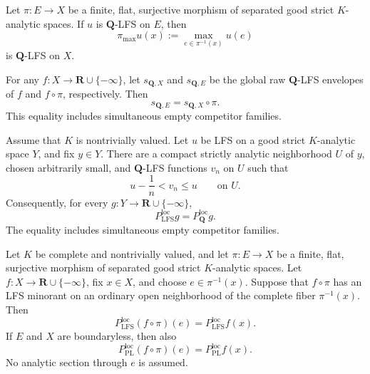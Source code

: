 \begin{theorem}
\label{thm:p031-rational-lfs-fiber-maximum}
Let $\pi:E\to X$ be a finite, flat, surjective morphism of separated good
strict $K$-analytic spaces.  If $u$ is $\mathbf Q$-LFS on $E$, then
\begin{equation}
\label{eq:p031-rational-lfs-fiber-maximum}
       \pi_{\max}u(x):=\max_{e\in\pi^{-1}(x)}u(e)
\end{equation}
is $\mathbf Q$-LFS on $X$.

For any $f:X\to\mathbf R\cup\{-\infty\}$, let $s_{\mathbf Q,X}$ and
$s_{\mathbf Q,E}$ be the global raw $\mathbf Q$-LFS envelopes of $f$ and
$f\circ\pi$, respectively.  Then
\begin{equation}
\label{eq:p031-rational-lfs-envelope-pullback}
                     s_{\mathbf Q,E}
                       =s_{\mathbf Q,X}\circ\pi.
\end{equation}
This equality includes simultaneous empty competitor families.
\end{theorem}

\begin{proposition}
\label{prop:p031-local-rational-lfs-cofinality}
Assume that $K$ is nontrivially valued.  Let $u$ be LFS on a good strict
$K$-analytic space $Y$, and fix $y\in Y$.  There are a compact strictly
analytic neighborhood $U$ of $y$, chosen arbitrarily small, and
$\mathbf Q$-LFS functions $v_n$ on $U$ such that
\begin{equation}
\label{eq:p031-one-sided-local-rationalization}
                    u-\frac1n<v_n\leq u
                    \qquad\text{on }U.
\end{equation}
Consequently, for every $g:Y\to\mathbf R\cup\{-\infty\}$,
\begin{equation}
\label{eq:p031-local-real-rational-lfs-cofinality}
             P_{\mathrm{LFS}}^{\mathrm{loc}}g
                  =P_{\mathbf Q}^{\mathrm{loc}}g.
\end{equation}
The equality includes simultaneous empty competitor families.
\end{proposition}

\begin{theorem}
\label{thm:p031-finite-flat-local-envelope-pullback}
Let $K$ be complete and nontrivially valued, and let
$\pi:E\to X$ be a finite, flat, surjective morphism of separated good
strict $K$-analytic spaces.  Let
$f:X\to\mathbf R\cup\{-\infty\}$, fix $x\in X$, and choose
$e\in\pi^{-1}(x)$.  Suppose that $f\circ\pi$ has an LFS minorant on an
ordinary open neighborhood of the complete fiber $\pi^{-1}(x)$.  Then
\begin{equation}
\label{eq:p031-finite-flat-local-lfs-pullback}
 P_{\mathrm{LFS}}^{\mathrm{loc}}(f\circ\pi)(e)
       =P_{\mathrm{LFS}}^{\mathrm{loc}}f(x).
\end{equation}
If $E$ and $X$ are boundaryless, then also
\begin{equation}
\label{eq:p031-finite-flat-local-pl-pullback}
 P_{\mathrm{PL}}^{\mathrm{loc}}(f\circ\pi)(e)
       =P_{\mathrm{PL}}^{\mathrm{loc}}f(x).
\end{equation}
No analytic section through $e$ is assumed.
\end{theorem}

